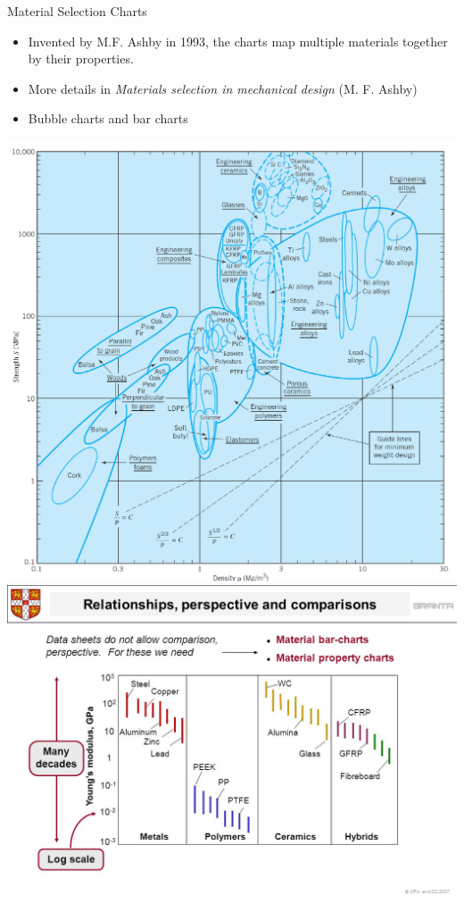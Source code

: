 \documentclass[10pt, svgnames]{beamer}
\begin{document}
\begin{frame}[label={sec:orga498555}]{Material Selection Charts}
\begin{itemize}
\item Invented by M.F. Ashby in 1993, the charts map multiple materials together by their properties.
\item More details in \emph{Materials selection in mechanical design} (M. F. Ashby)
\item Bubble charts and bar charts
\end{itemize}

\centering
\includegraphics[height=0.5\textheight]{pictures/strength-density-diagram}
\includegraphics[height=0.5\textheight]{pictures/mat-bar-chart}
\end{frame}
\end{document}
